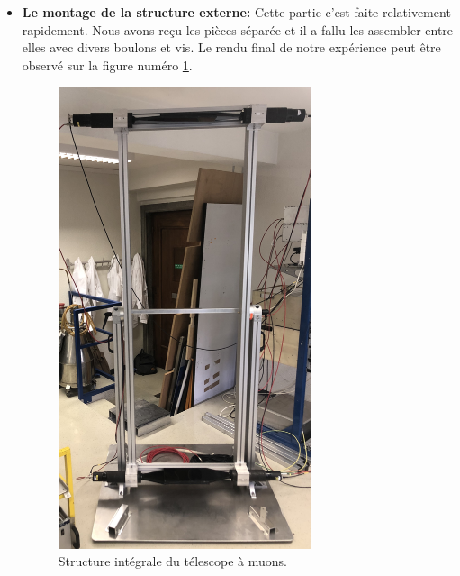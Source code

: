 \documentclass[12pt]{article}
\begin{document}
\begin{itemize}
    \item \textbf{Le montage de la structure externe: } Cette partie c'est faite relativement rapidement. Nous avons reçu les pièces séparée et il a fallu les assembler entre elles avec divers boulons et vis. Le rendu final de notre expérience peut être observé sur la figure numéro \ref{fig:Structure_integrale}.
    \begin{figure}[htpb!]
        \centering
        \includegraphics[width=0.7\textwidth]{Images/Photos/Structure_integrale_exp.jpg}
        \caption{Structure intégrale du télescope à muons.}
        \label{fig:Structure_integrale}
    \end{figure}
    
    \end{itemize}


\end{document}
